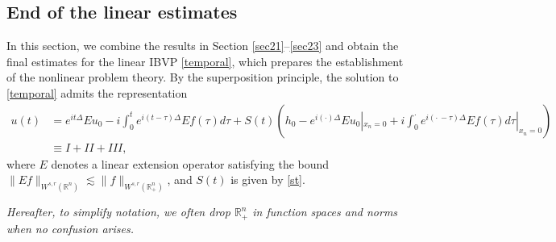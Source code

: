 \documentclass[preprint,compress,12pt]{elsarticle}
\numberwithin{equation}{section}
\begin{document}
\subsection{End of the linear estimates}\label{sec24}

In this section, we combine the results in Section \ref{sec21}--\ref{sec23} and obtain the final estimates for the linear IBVP \eqref{temporal}, which prepares the establishment of the nonlinear problem theory. By the superposition principle, the solution to \eqref{temporal} admits the representation
{\small \begin{equation}\label{turbine}	
		\begin{aligned}		u(t)&=e^{it\Delta}Eu_{0}-i\int_{0}^{t}e^{i(t-\tau)\Delta}Ef(\tau)d\tau+S(t)\left(h_{0}-e^{i(\cdot)\Delta}Eu_{0}|_{x_{n}=0}+i\int_{0}^{\cdot}e^{i(\cdot\,-\tau)\Delta}Ef(\tau)d\tau|_{x_{n}=0}\right)\\
			&\equiv I+II+III,
		\end{aligned}
\end{equation}}
where $E$ denotes a linear extension operator satisfying the bound $\|Ef\|_{W^{s,r}(\mathbb{R}^{n})}\lesssim \|f\|_{W^{s,r}(\mathbb{R}^{n}_{+})}$, and $S(t)$ is given by \eqref{st}.

\emph{Hereafter, to simplify notation, we often drop $\mathbb{R}_{+}^{n}$ in function spaces and norms when no confusion arises.}
\end{document}
